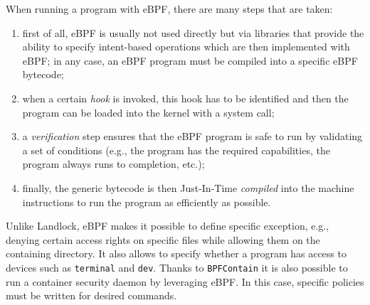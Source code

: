 When running a program with eBPF, there are many steps that are taken:
\begin{enumerate}
  \item first of all, eBPF is usually not used directly but via libraries that provide the ability to specify
        intent-based operations which are then implemented with eBPF; in any case, an eBPF program must be
        compiled into a specific eBPF bytecode;
  \item when a certain \textit{hook} is invoked, this hook has to be identified and then the program can be loaded
        into the kernel with a system call;
  \item a \textit{verification} step ensures that the eBPF program is safe to run by validating a set of conditions
        (e.g., the program has the required capabilities, the program always runs to completion, etc.);
  \item finally, the generic bytecode is then Just-In-Time \textit{compiled} into the machine instructions
        to run the program as efficiently as possible.
\end{enumerate}

Unlike Landlock, eBPF makes it possible to define specific exception, e.g., denying
certain access rights on specific files while allowing them on the containing directory.
It also allows to specify whether a program has access to devices such as \texttt{terminal}
and \texttt{dev}.
Thanks to \texttt{BPFContain} \cite{bpfcontain}
it is also possible to run a container security daemon by leveraging eBPF.  In this case,
specific policies must be written for desired commands.